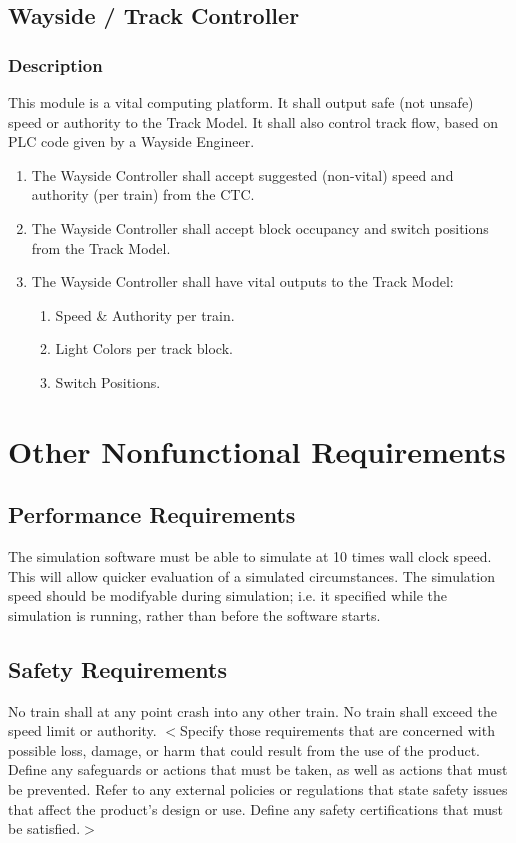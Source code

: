 \documentclass{scrreprt}
\begin{document}
\section{Wayside / Track Controller}

\subsection{Description}
This module is a vital computing platform.
It shall output safe (not unsafe) speed or authority to the Track Model.
It shall also control track flow, based on PLC code given by a Wayside Engineer.

\begin{enumerate}
    \item The Wayside Controller shall accept suggested (non-vital) speed and authority (per train) from the CTC.
    \item The Wayside Controller shall accept block occupancy and switch positions from the Track Model.
    \item The Wayside Controller shall have vital outputs to the Track Model:
        \begin{enumerate}
            \item Speed \& Authority per train.
            \item Light Colors per track block.
            \item Switch Positions.
            \end{enumerate}
\end{enumerate}

\chapter{Other Nonfunctional Requirements}

\section{Performance Requirements}
The simulation software must be able to simulate at 10 times wall clock speed.
This will allow quicker evaluation of a simulated circumstances. The simulation
speed should be modifyable during simulation; i.e. it specified while the simulation
is running, rather than before the software starts.

\section{Safety Requirements}
No train shall at any point crash into any other train. No train shall exceed
the speed limit or authority.
$<$Specify those requirements that are concerned with possible loss, damage, or 
harm that could result from the use of the product. Define any safeguards or 
actions that must be taken, as well as actions that must be prevented. Refer to 
any external policies or regulations that state safety issues that affect the 
product’s design or use. Define any safety certifications that must be 
satisfied.$>$
\end{document}
